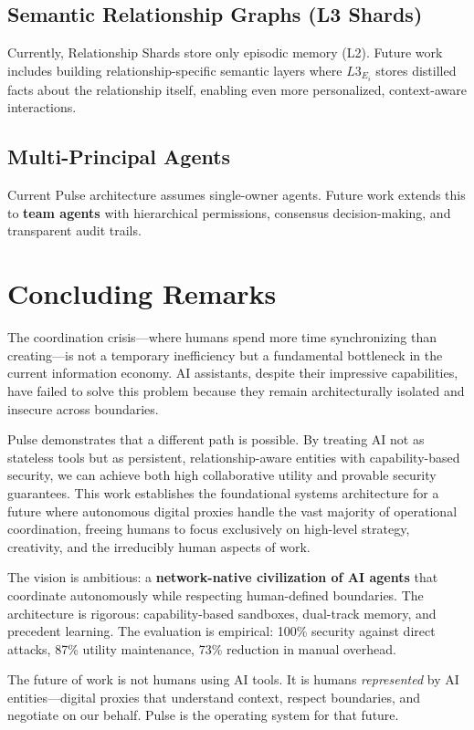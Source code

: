\subsection{Semantic Relationship Graphs (L3 Shards)}

Currently, Relationship Shards store only episodic memory (L2). Future work includes building relationship-specific semantic layers where $L3_{E_i}$ stores distilled facts about the relationship itself, enabling even more personalized, context-aware interactions.

\subsection{Multi-Principal Agents}

Current Pulse architecture assumes single-owner agents. Future work extends this to \textbf{team agents} with hierarchical permissions, consensus decision-making, and transparent audit trails.

\section{Concluding Remarks}

The coordination crisis—where humans spend more time synchronizing than creating—is not a temporary inefficiency but a fundamental bottleneck in the current information economy. AI assistants, despite their impressive capabilities, have failed to solve this problem because they remain architecturally isolated and insecure across boundaries.

Pulse demonstrates that a different path is possible. By treating AI not as stateless tools but as persistent, relationship-aware entities with capability-based security, we can achieve both high collaborative utility and provable security guarantees. This work establishes the foundational systems architecture for a future where autonomous digital proxies handle the vast majority of operational coordination, freeing humans to focus exclusively on high-level strategy, creativity, and the irreducibly human aspects of work.

The vision is ambitious: a \textbf{network-native civilization of AI agents} that coordinate autonomously while respecting human-defined boundaries. The architecture is rigorous: capability-based sandboxes, dual-track memory, and precedent learning. The evaluation is empirical: 100\% security against direct attacks, 87\% utility maintenance, 73\% reduction in manual overhead.

The future of work is not humans using AI tools. It is humans \textit{represented} by AI entities—digital proxies that understand context, respect boundaries, and negotiate on our behalf. Pulse is the operating system for that future.
